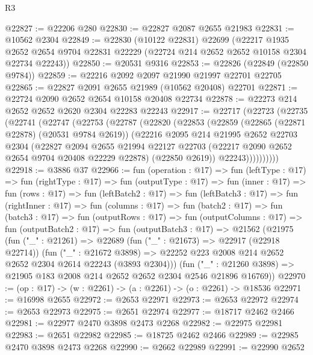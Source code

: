 \begin{lexlean}{R3}
\begin{coremodule}
@22827 := @22206 @280
@22830 := @22827 @2087 @2655 @21983
@22831 := @10562 @2304
@22849 := @22830
    (@10122 @22831)
    @22699
    (@22217
      @1935
      @2652
      @2654
      @9704
      @22831
      @22229
      (@22724 @214 @2652 @2652 @10158 @2304 @22734 @22243))
@22850 := @20531 @9316
@22853 := @22826 (@22849 (@22850 @9784))
@22859 := @22216 @2092 @2097 @21990 @21997 @22701 @22705
@22865 := @22827 @2091 @2655 @21989 (@10562 @20408) @22701
@22871 := @22724 @2090 @2652 @2654 @10158 @20408 @22734
@22878 := @22273 @214 @2652 @2652 @2620 @2304 @22283 @22243
@22917 := @22717
    (@22723
      (@22735
        (@22741
          (@22747
            (@22753
              (@22787
                (@22820
                  (@22853
                    (@22859
                      (@22865 (@22871 @22878) (@20531 @9784 @2619))
                      (@22216
                        @2095
                        @214
                        @21995
                        @2652
                        @22703
                        @2304
                        (@22827
                          @2094
                          @2655
                          @21994
                          @22127
                          @22703
                          (@22217 @2090 @2652 @2654 @9704 @20408 @22229 @22878)
                          (@22850 @2619))
                        @22243))))))))))
@22918 := @3886 @37
@22966 := fun (operation : @17) =>
  fun (leftType : @17) =>
  fun (rightType : @17) =>
  fun (outputType : @17) =>
  fun (inner : @17) =>
  fun (rows : @17) =>
  fun (leftBatch2 : @17) =>
  fun (leftBatch3 : @17) =>
  fun (rightInner : @17) =>
  fun (columns : @17) =>
  fun (batch2 : @17) =>
  fun (batch3 : @17) =>
  fun (outputRows : @17) =>
  fun (outputColumns : @17) =>
  fun (outputBatch2 : @17) =>
  fun (outputBatch3 : @17) =>
  @21562
    (@21975
      (fun ("_" : @21261) =>
      @22689
        (fun ("_" : @21673) => @22917 (@22918 @22714))
        (fun ("_" : @21672 @3898) =>
        @22252 @223 @2008 @214 @2652 @2652 @2304 @2614 @22243 (@3893 @2304)))
      (fun ("_" : @21260 @3898) => @21905 @183 @2008 @214 @2652 @2652 @2304 @2546 @21896 @16769))
@22970 := (op : @17) -> (w : @2261) -> (a : @2261) -> (o : @2261) -> @18536
@22971 := @16998 @2655
@22972 := @2653 @22971
@22973 := @2653 @22972
@22974 := @2653 @22973
@22975 := @2651 @22974
@22977 := @18717 @2462 @2466
@22981 := @22977 @2470 @3898 @2473 @2268
@22982 := @22975 @22981
@22983 := @2651 @22982
@22985 := @18725 @2462 @2466
@22989 := @22985 @2470 @3898 @2473 @2268
@22990 := @2662 @22989
@22991 := @22990 @2652

\end{coremodule}
\end{lexlean}
